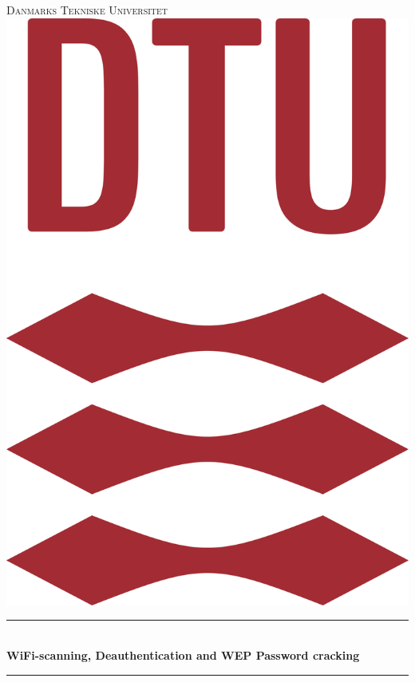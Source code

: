 \begin{titlepage}

\newcommand{\HRule}{\rule{\linewidth}{0.5mm}}

\center

\textsc{\Large Danmarks Tekniske Universitet}\\[1.5cm]

\includegraphics[scale=0.15]{Billeder/DTULogo.png}\\[1.3cm]

\HRule\\[0.5cm]

{\huge\bfseries WiFi-scanning, Deauthentication and WEP Password cracking}\\[0.4cm]

\HRule\\[1.3cm]


\end{titlepage}
